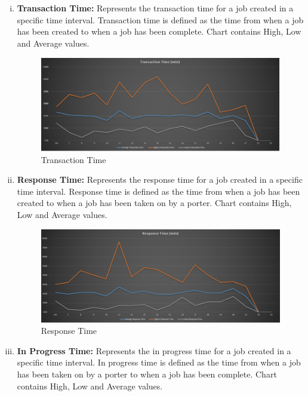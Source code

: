 \documentclass[paper=letter, fontsize=10pt]{scrartcl}
\numberwithin{equation}{section}		%
\numberwithin{figure}{section}			%
\numberwithin{table}{section}				%
\begin{document}
	\begin{enumerate}[(i)]
		\item \textbf{Transaction Time:} Represents the transaction time for a job created in a specific time interval. Transaction time is defined as the time from when a job has been created to when a job has been complete. Chart contains High, Low and Average values.
		\begin{figure}[!htbp]
		\begin{center}
			\includegraphics[width=1\columnwidth, height=0.5\textheight, keepaspectratio]{transactionTime.png}
			\caption{Transaction Time}
		\end{center}
		\end{figure}
		\item \textbf{Response Time:} Represents the response time for a job created in a specific time interval. Response time is defined as the time from when a job has been created to when a job has been taken on by a porter. Chart contains High, Low and Average values.
		\begin{figure}[!htbp]		
		\begin{center}
			\includegraphics[width=1\columnwidth, height=0.5\textheight, keepaspectratio]{responseTime.png}
			\caption{Response Time}
		\end{center}
		\end{figure}
		\item \textbf{In Progress Time:} Represents the in progress time for a job created in a specific time interval. In progress time is defined as the time from when a job has been taken on by a porter to when a job has been complete. Chart contains High, Low and Average values.

\end{enumerate}
\end{document}

